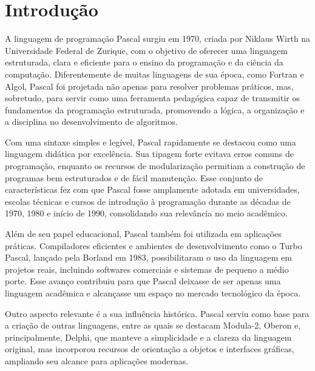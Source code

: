 \documentclass[12pt,a4paper,oneside]{abntex2}
\begin{document}
\imprimircapa  %

\imprimirfolhaderosto  %

\tableofcontents*
\newpage  %

\textual
\chapter{Introdução}
A linguagem de programação Pascal surgiu em 1970, criada por Niklaus Wirth na Universidade Federal de Zurique, com o objetivo de oferecer uma linguagem estruturada, clara e eficiente para o ensino da programação e da ciência da computação. Diferentemente de muitas linguagens de sua época, como Fortran e Algol, Pascal foi projetada não apenas para resolver problemas práticos, mas, sobretudo, para servir como uma ferramenta pedagógica capaz de transmitir os fundamentos da programação estruturada, promovendo a lógica, a organização e a disciplina no desenvolvimento de algoritmos.

Com uma sintaxe simples e legível, Pascal rapidamente se destacou como uma linguagem didática por excelência. Sua tipagem forte evitava erros comuns de programação, enquanto os recursos de modularização permitiam a construção de programas bem estruturados e de fácil manutenção. Esse conjunto de características fez com que Pascal fosse amplamente adotada em universidades, escolas técnicas e cursos de introdução à programação durante as décadas de 1970, 1980 e início de 1990, consolidando sua relevância no meio acadêmico.

Além de seu papel educacional, Pascal também foi utilizada em aplicações práticas. Compiladores eficientes e ambientes de desenvolvimento como o Turbo Pascal, lançado pela Borland em 1983, possibilitaram o uso da linguagem em projetos reais, incluindo softwares comerciais e sistemas de pequeno a médio porte. Esse avanço contribuiu para que Pascal deixasse de ser apenas uma linguagem acadêmica e alcançasse um espaço no mercado tecnológico da época.

Outro aspecto relevante é a sua influência histórica. Pascal serviu como base para a criação de outras linguagens, entre as quais se destacam Modula-2, Oberon e, principalmente, Delphi, que manteve a simplicidade e a clareza da linguagem original, mas incorporou recursos de orientação a objetos e interfaces gráficas, ampliando seu alcance para aplicações modernas.
\end{document}
